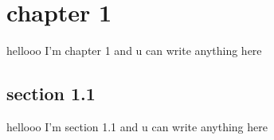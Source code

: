 \section{chapter 1}
hellooo I'm chapter 1 and u can write anything here
\subsection{section 1.1}
hellooo I'm section 1.1 and u can write anything here